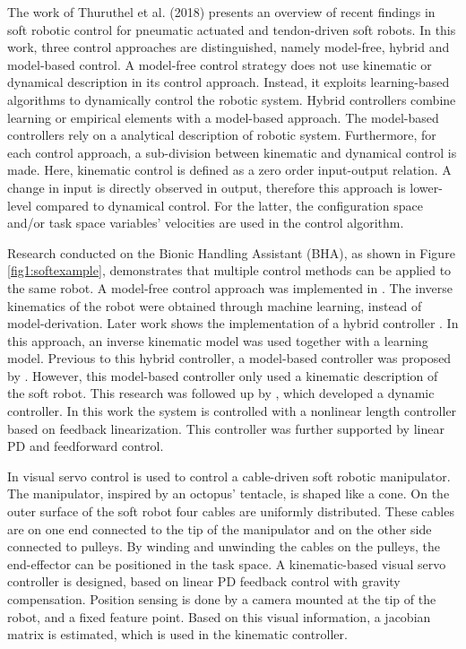 The work of Thuruthel et al. (2018) \cite{george2018control} presents an overview of recent findings in soft robotic control for pneumatic actuated and tendon-driven soft robots. In this work, three control approaches are distinguished, namely model-free, hybrid and model-based control. A model-free control strategy does not use kinematic or dynamical description in its control approach. Instead, it exploits learning-based algorithms to dynamically control the robotic system. Hybrid controllers combine learning or empirical elements with a model-based approach. The model-based controllers rely on a analytical description of robotic system. Furthermore, for each control approach, a sub-division between kinematic and dynamical control is made. Here, kinematic control is defined as a zero order input-output relation. A change in input is directly observed in output, therefore this approach is lower-level compared to dynamical control. For the latter, the configuration space and/or task space variables' velocities are used in the control algorithm. 


Research conducted on the Bionic Handling Assistant (BHA), as shown in Figure \ref{fig1:softexample}, demonstrates that multiple control methods can be applied to the same robot. A model-free control approach was implemented in \cite{rolf2013efficient}. The inverse kinematics of the robot were obtained through machine learning, instead of model-derivation. Later work shows the implementation of a hybrid controller \cite{reinhart2017hybrid}. In this approach, an inverse kinematic model was used together with a learning model. Previous to this hybrid controller, a model-based controller was proposed by \cite{mahl2014bhakin}. However, this model-based controller only used a kinematic description of the soft robot. This research was followed up by \cite{falkenhahn2016dynamic}, which developed a dynamic controller. In this work the system is controlled with a nonlinear length controller based on feedback linearization. This controller was further supported by linear PD and feedforward control. 

In \cite{wang2013visual} visual servo control is used to control a cable-driven soft robotic manipulator. The manipulator, inspired by an octopus' tentacle, is shaped like a cone. On the outer surface of the soft robot four cables are uniformly distributed. These cables are on one end connected to the tip of the manipulator and on the other side connected to pulleys. By winding and unwinding the cables on the pulleys, the end-effector can be positioned in the task space. A kinematic-based visual servo controller is designed, based on linear PD feedback control with gravity compensation. Position sensing is done by a camera mounted at the tip of the robot, and a fixed feature point. Based on this visual information, a jacobian matrix is estimated, which is used in the kinematic controller.

